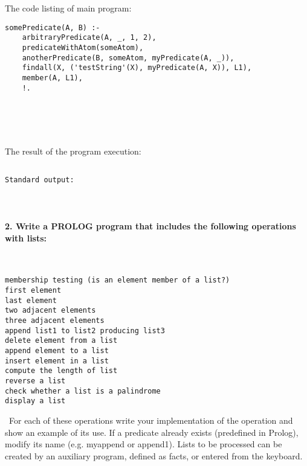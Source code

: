 \documentclass{article}
\begin{document}
\paragraph{}\

		\rmfamily
		\noindent The code listing of main program:
		\begin{verbatim}
somePredicate(A, B) :-
    arbitraryPredicate(A, _, 1, 2),
    predicateWithAtom(someAtom),
    anotherPredicate(B, someAtom, myPredicate(A, _)),
    findall(X, ('testString'(X), myPredicate(A, X)), L1),
    member(A, L1),
    !.
		\end{verbatim}


\paragraph{}\
	
	\rmfamily\
	
		\noindent The result of the program execution:
		
	\ttfamily
	\begin{lstlisting}[language=bash]

Standard output:

	\end{lstlisting}
	
	
\paragraph{}\

	
	
	\rmfamily
	
	\paragraph{2. Write a PROLOG program that includes the following operations with lists: }\
	
	\ttfamily
	
	\begin{lstlisting}
membership testing (is an element member of a list?)
first element
last element
two adjacent elements
three adjacent elements
append list1 to list2 producing list3
delete element from a list
append element to a list
insert element in a list
compute the length of list
reverse a list
check whether a list is a palindrome
display a list
	\end{lstlisting}
	
	\rmfamily\
	For each of these operations write your implementation of the operation and show an example of its use. If a predicate already exists (predefined in Prolog), modify its name (e.g. myappend or append1).
	Lists to be processed can be created by an auxiliary program, defined as facts, or entered from the keyboard.
	\newline
	
\end{document}
